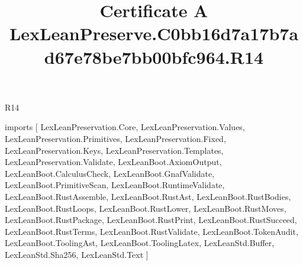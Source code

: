 \begin{lexlean}{R14}
\title{Certificate A LexLeanPreserve.C0bb16d7a17b7ad67e78be7bb00bfc964.R14}
\begin{coremodule}
imports [
  LexLeanPreservation.Core,
  LexLeanPreservation.Values,
  LexLeanPreservation.Primitives,
  LexLeanPreservation.Fixed,
  LexLeanPreservation.Keys,
  LexLeanPreservation.Templates,
  LexLeanPreservation.Validate,
  LexLeanBoot.AxiomOutput,
  LexLeanBoot.CalculusCheck,
  LexLeanBoot.GnafValidate,
  LexLeanBoot.PrimitiveScan,
  LexLeanBoot.RuntimeValidate,
  LexLeanBoot.RustAssemble,
  LexLeanBoot.RustAst,
  LexLeanBoot.RustBodies,
  LexLeanBoot.RustLoops,
  LexLeanBoot.RustLower,
  LexLeanBoot.RustMoves,
  LexLeanBoot.RustPackage,
  LexLeanBoot.RustPrint,
  LexLeanBoot.RustSucceed,
  LexLeanBoot.RustTerms,
  LexLeanBoot.RustValidate,
  LexLeanBoot.TokenAudit,
  LexLeanBoot.ToolingAst,
  LexLeanBoot.ToolingLatex,
  LexLeanStd.Buffer,
  LexLeanStd.Sha256,
  LexLeanStd.Text
]


\end{coremodule}
\end{lexlean}
